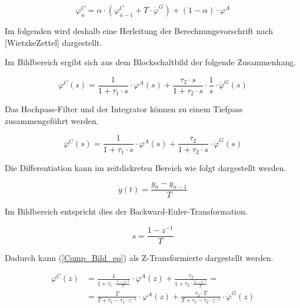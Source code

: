 \documentclass{article}
\begin{document}
\begin{equation}
\label{Komp_BV_eq}
\varphi^C_n = \alpha \cdot (\varphi^C_{n-1} + T \cdot \dot{\varphi}^G) + (1-\alpha) \cdot \varphi^A
\end{equation}

Im folgenden wird deshalb eine Herleitung der Berechnungsvorschrift nach [WietzkeZettel] dargestellt.
\newline

Im Bildbereich ergibt sich aus dem Blockschaltbild der folgende Zusammenhang.

\begin{equation}
\varphi^C(s) = \frac{1}{1 + \tau_1 \cdot s} \cdot \varphi^A(s) + \frac{\tau_2 \cdot s}{1 + \tau_2 \cdot s} \cdot \frac{1}{s} \cdot \dot{\varphi}^G(s)
\end{equation}

Das Hochpass-Filter und der Integrator können zu einem Tiefpass zusammengeführt werden.

\begin{equation}
\label{Comp_Bild_eq}
\varphi^C(s) = \frac{1}{1 + \tau_1 \cdot s} \cdot \varphi^A(s) + \frac{\tau_2}{1 + \tau_2 \cdot s} \cdot \dot{\varphi}^G(s)
\end{equation}

Die Differentiation kann im zeitdiskreten Bereich wie folgt dargestellt werden.

\begin{equation}
\dot{y}(t) = \frac{y_n - y_{n-1}}{T} 
\end{equation}

Im Bildbereich entspricht dies der Backward-Euler-Transformation.

\begin{equation}
s = \frac{1 - z^{-1}}{T}
\end{equation}

Dadurch kann (\ref{Comp_Bild_eq}) als Z-Transformierte dargestellt werden.

\begin{equation}
\begin{split}
\varphi^C(z) & = \frac{1}{1 + \tau_1 \cdot \frac{1 - z^{-1}}{T} } \cdot \varphi^A(z) + \frac{\tau_2}{1 + \tau_2 \cdot \frac{1 - z^{-1}}{T}} = \\
& = \frac{T}{T + \tau_1 - \tau_1 \cdot z^{-1}} \cdot \varphi^A(z) + \frac{\tau_2 \cdot T}{T + \tau_2 - \tau_2 \cdot z^{-1}} \cdot \dot{\varphi}^G(z)
\end{split}
\end{equation}
\end{document}
